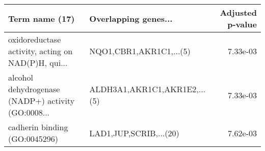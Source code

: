 \begin{tabular}{llr}
\toprule
                                    Term name (17) &         Overlapping genes... &  Adjusted p-value \\
\midrule
oxidoreductase activity, acting on NAD(P)H, qui... &      NQO1,CBR1,AKR1C1,...(5) &          7.33e-03 \\
alcohol dehydrogenase (NADP+) activity (GO:0008... & ALDH3A1,AKR1C1,AKR1E2,...(5) &          7.33e-03 \\
                     cadherin binding (GO:0045296) &       LAD1,JUP,SCRIB,...(20) &          7.62e-03 \\
\bottomrule
\end{tabular}
